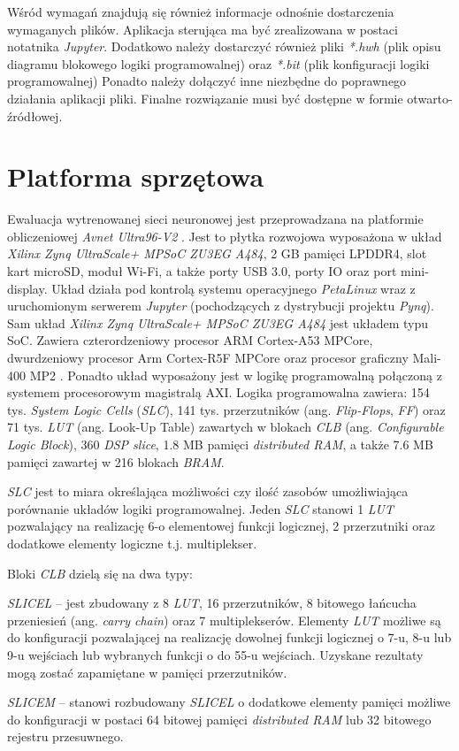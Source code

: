 Wśród wymagań znajdują się również informacje odnośnie dostarczenia wymaganych plików.
Aplikacja sterująca ma być zrealizowana w postaci notatnika \emph{Jupyter}.
Dodatkowo należy dostarczyć również pliki \emph{*.hwh} (plik opisu diagramu blokowego logiki programowalnej)
oraz \emph{*.bit} (plik konfiguracji logiki programowalnej) Ponadto należy dołączyć inne niezbędne do poprawnego działania aplikacji pliki. 
Finalne rozwiązanie musi być dostępne w formie otwarto-źródłowej.

\section{Platforma sprzętowa}
Ewaluacja wytrenowanej sieci neuronowej jest przeprowadzana na platformie obliczeniowej \emph{Avnet Ultra96-V2} \cite{avnet_ultra96}. 
Jest to płytka rozwojowa wyposażona w układ \emph{Xilinx Zynq UltraScale+ MPSoC ZU3EG A484}, 2 GB pamięci LPDDR4, slot kart microSD, moduł Wi-Fi, a także porty USB 3.0, porty IO oraz port mini-display. 
Układ działa pod kontrolą systemu operacyjnego \emph{PetaLinux} wraz z uruchomionym serwerem \emph{Jupyter} (pochodzących z dystrybucji projektu \emph{Pynq}\cite{pynq}). 
Sam układ \emph{Xilinx Zynq UltraScale+ MPSoC ZU3EG A484} jest układem typu SoC. 
Zawiera czterordzeniowy procesor ARM Cortex-A53 MPCore, dwurdzeniowy procesor Arm Cortex-R5F MPCore oraz procesor graficzny Mali-400 MP2 \cite{zynq_product_guide}. 
Ponadto układ wyposażony jest w logikę programowalną połączoną z systemem procesorowym magistralą AXI. 
Logika programowalna zawiera: 
154 tys. \emph{System Logic Cells} (\emph{SLC}), 
141 tys. przerzutników (ang. \emph{Flip-Flops}, \emph{FF}) 
oraz 71 tys. \emph{LUT} (ang. Look-Up Table) zawartych w blokach \emph{CLB} (ang. \emph{Configurable Logic Block}), 360 \emph{DSP slice}, 1.8 MB pamięci \emph{distributed RAM}, a także 7.6 MB pamięci zawartej w 216 blokach \emph{BRAM}. 

\emph{SLC} jest to miara określająca możliwości czy ilość zasobów umożliwiająca porównanie układów logiki programowalnej.
Jeden \emph{SLC} stanowi 1 \emph{LUT} pozwalający na realizację 6-o elementowej funkcji logicznej, 2 przerzutniki oraz dodatkowe elementy logiczne t.j. multiplekser. 

Bloki \emph{CLB} \cite{clb} dzielą się na dwa typy:
\begin{description}
\item \emph{SLICEL} -- jest zbudowany z 8 \emph{LUT}, 16 przerzutników, 8 bitowego łańcucha przeniesień (ang. \emph{carry chain}) oraz 7 multiplekserów. 
Elementy \emph{LUT} możliwe są do konfiguracji pozwalającej na realizację dowolnej funkcji logicznej o 7-u, 8-u lub 9-u wejściach lub wybranych funkcji o do 55-u wejściach. 
Uzyskane rezultaty mogą zostać zapamiętane w pamięci przerzutników.
\item \emph{SLICEM} -- stanowi rozbudowany \emph{SLICEL} o dodatkowe elementy pamięci możliwe do konfiguracji w postaci 64 bitowej pamięci \emph{distributed RAM} lub 32 bitowego rejestru przesuwnego. 
\end{description}

